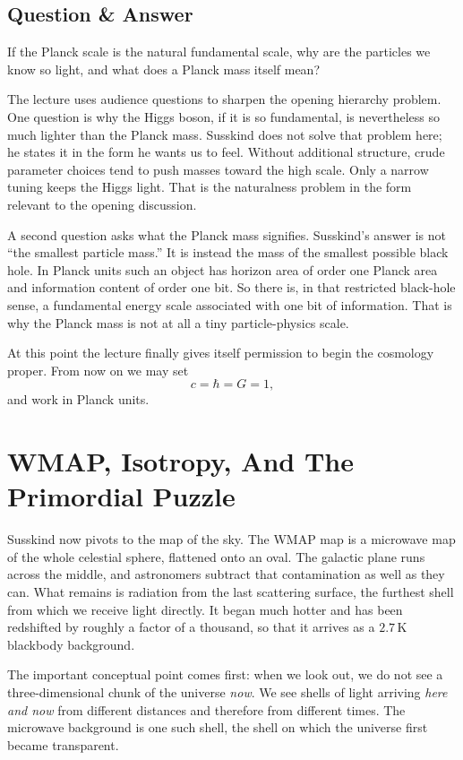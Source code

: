 \subsection{Question \& Answer}

If the Planck scale is the natural fundamental scale, why are the particles we know so light, and what does a Planck mass itself mean?

The lecture uses audience questions to sharpen the opening hierarchy problem. One question is why the Higgs boson, if it is so fundamental, is nevertheless so much lighter than the Planck mass. Susskind does not solve that problem here; he states it in the form he wants us to feel. Without additional structure, crude parameter choices tend to push masses toward the high scale. Only a narrow tuning keeps the Higgs light. That is the naturalness problem in the form relevant to the opening discussion.

A second question asks what the Planck mass signifies. Susskind's answer is not “the smallest particle mass.” It is instead the mass of the smallest possible black hole. In Planck units such an object has horizon area of order one Planck area and information content of order one bit. So there is, in that restricted black-hole sense, a fundamental energy scale associated with one bit of information. That is why the Planck mass is not at all a tiny particle-physics scale.

At this point the lecture finally gives itself permission to begin the cosmology proper. From now on we may set
\begin{equation}
c=\hbar=G=1,
\end{equation}
and work in Planck units.

\section{WMAP, Isotropy, And The Primordial Puzzle}

Susskind now pivots to the map of the sky. The WMAP map is a microwave map of the whole celestial sphere, flattened onto an oval. The galactic plane runs across the middle, and astronomers subtract that contamination as well as they can. What remains is radiation from the last scattering surface, the furthest shell from which we receive light directly. It began much hotter and has been redshifted by roughly a factor of a thousand, so that it arrives as a \(2.7\,\mathrm{K}\) blackbody background.

The important conceptual point comes first: when we look out, we do not see a three-dimensional chunk of the universe \emph{now}. We see shells of light arriving \emph{here and now} from different distances and therefore from different times. The microwave background is one such shell, the shell on which the universe first became transparent.

